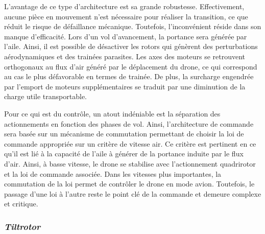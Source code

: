         L'avantage de ce type d'architecture est sa grande robustesse. Effectivement, aucune pièce en mouvement n'est nécessaire pour réaliser la transition, ce que réduit le risque de défaillance mécanique. Toutefois, l'inconvénient réside dans son manque d'efficacité. Lors d'un vol d'avancement, la portance sera générée par l'aile. Ainsi, il est possible de désactiver les rotors qui génèrent des perturbations aérodynamiques et des trainées parasites. Les axes des moteurs se retrouvent orthogonaux au flux d'air généré par le déplacement du drone, ce qui correspond au cas le plus défavorable en termes de trainée. De plus, la surcharge engendrée par l'emport de moteurs supplémentaires se traduit par une diminution de la charge utile transportable. 

        Pour ce qui est du contrôle, un atout indéniable est la séparation des actionnements en fonction des phases de vol. Ainsi, l'architecture de commande sera basée sur un mécanisme de commutation permettant de choisir la loi de commande appropriée sur un critère de vitesse air. Ce critère est pertinent en ce qu'il est lié à la capacité de l'aile à générer de la portance induite par le flux d'air. Ainsi, à basse vitesse, le drone se stabilise avec l'actionnement quadrirotor et la loi de commande associée. Dans les vitesses plus importantes, la commutation de la loi permet de contrôler le drone en mode avion. Toutefois, le passage d'une loi à l'autre reste le point clé de la commande et demeure complexe et critique.

        \subsubsection*{\textit{Tiltrotor}}

